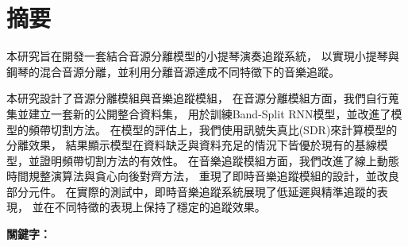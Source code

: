 \documentclass[class=NCU_thesis, crop=false]{standalone}
\begin{document}
\chapter{摘要}

本研究旨在開發一套結合音源分離模型的小提琴演奏追蹤系統，
以實現小提琴與鋼琴的混合音源分離，並利用分離音源達成不同特徵下的音樂追蹤。

本研究設計了音源分離模組與音樂追蹤模組，
在音源分離模組方面，我們自行蒐集並建立一套新的公開整合資料集，
用於訓練Band-Split RNN模型，並改進了模型的頻帶切割方法。
在模型的評估上，我們使用訊號失真比(SDR)來計算模型的分離效果，
結果顯示模型在資料缺乏與資料充足的情況下皆優於現有的基線模型，並證明頻帶切割方法的有效性。
在音樂追蹤模組方面，我們改進了線上動態時間規整演算法與貪心向後對齊方法，
重現了即時音樂追蹤模組的設計，並改良部分元件。
在實際的測試中，即時音樂追蹤系統展現了低延遲與精準追蹤的表現，
並在不同特徵的表現上保持了穩定的追蹤效果。


\vspace{2em}
\noindent \textbf{關鍵字：} \keywordsZh{} %
\end{document}
